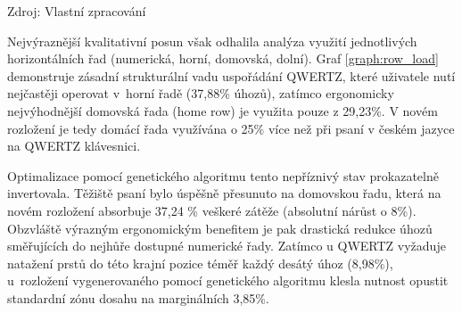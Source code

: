 \documentclass[a4paper, twoside, 12pt, czech]{article}
\begin{document}
\begin{graph}[hp]
    \caption{Srovnání zátěže jednotlivých řad}
    \vspace{0.4cm}
    
    \label{graph:row_load}
    \small{Zdroj: Vlastní zpracování}
\end{graph}


Nejvýraznější kvalitativní posun však odhalila analýza využití jednotlivých 
horizontálních řad (numerická, horní, domovská, dolní). Graf \ref{graph:row_load} 
demonstruje zásad\-ní strukturální vadu uspořádání QWERTZ, které uživatele nutí 
nejčastěji operovat v~horní řadě (37,88\space\% úhozů), zatímco ergonomicky nejvýhodnější 
domovská řada (home row) je využita pouze z 29,23\space\%. V novém rozložení je tedy 
domácí řada využívána o 25\space\% více než při psaní v českém jazyce na QWERTZ klávesnici.


Optimalizace pomocí genetického algoritmu tento nepříznivý stav prokazatelně 
invertovala. Těžiště psaní bylo úspěšně přesunuto na domovskou řadu, která na 
novém rozložení absorbuje 37,24 \% veškeré zátěže (absolutní nárůst o 8\space\%). 
Obzvláště výrazným ergonomickým benefitem je pak drastická redukce úhozů směřujících 
do nejhůře dostupné numerické řady. Zatímco u QWERTZ vyžaduje natažení prstů do 
této krajní pozice téměř každý desátý úhoz (8,98\space\%), u~rozložení vygenerovaného 
pomocí genetického algoritmu klesla nutnost 
opustit standardní zónu dosahu na marginálních 3,85\space\%.
\end{document}
